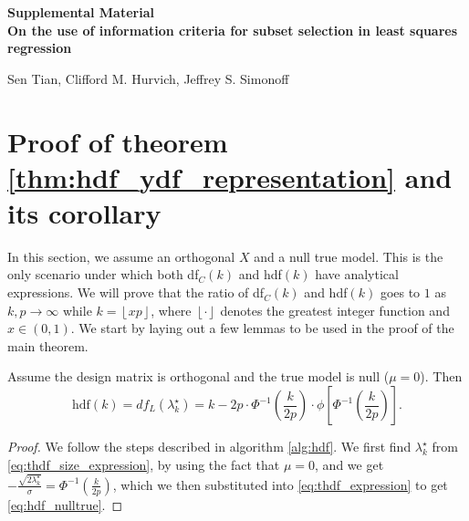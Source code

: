 \beginsupplement
\appendix
{}
\begin{center}
\textbf{\large Supplemental Material \\
On the use of information criteria for subset selection in least squares regression}

Sen Tian, Clifford M. Hurvich, Jeffrey S. Simonoff
\end{center}

\section{Proof of theorem \ref{thm:hdf_ydf_representation} and its corollary}
\label{sec:proof_hdf_ydf}
In this section, we assume an orthogonal $X$ and a null true model. This is the only scenario under which both df$_C(k)$ and hdf$(k)$ have analytical expressions. We will prove that the ratio of df$_C(k)$ and hdf$(k)$ goes to $1$ as $k,p\rightarrow \infty$ while $k=\left \lfloor{xp}\right \rfloor $, where $\left \lfloor{\cdot}\right \rfloor$ denotes the greatest integer function and $x\in(0,1)$. We start by laying out a few lemmas to be used in the proof of the main theorem.
\begin{lemma}
	\label{lemma:hdf_nulltrue}
	Assume the design matrix is orthogonal and the true model is null ($\mu=0$). Then
	\begin{equation}
	\text{hdf}(k) = df_L(\lambda_k^\star) = k - 2p\cdot \Phi^{-1} \left(\frac{k}{2p}\right) \cdot \phi\left[\Phi^{-1}\left(\frac{k}{2p}\right) \right].
	\label{eq:hdf_nulltrue}
	\end{equation}
\end{lemma}
\begin{proof}
	We follow the steps described in algorithm \ref{alg:hdf}. We first find $\lambda_k^\star$ from \eqref{eq:thdf_size_expression}, by using the fact that $\mu=0$, and we get $\displaystyle -\frac{\sqrt{2\lambda_k^\star}}{\sigma} = \displaystyle \Phi^{-1}\left(\frac{k}{2p}\right)$, which we then substituted into \eqref{eq:thdf_expression} to get \eqref{eq:hdf_nulltrue}.
\end{proof}

